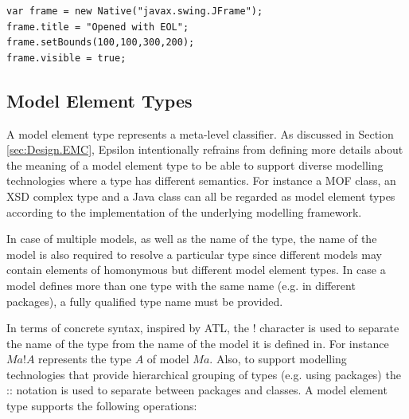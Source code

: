\begin{lstlisting}[basicstyle=\ttfamily\footnotesize, flexiblecolumns=true, numbers=none, nolol=true, caption=Demonstration of NativeType in EOL, label=lst:Native, numbers=left, language=EOL, tabsize=2]
var frame = new Native("javax.swing.JFrame");
frame.title = "Opened with EOL";
frame.setBounds(100,100,300,200);
frame.visible = true;
\end{lstlisting}

\subsection{Model Element Types}

A model element type represents a meta-level classifier. As discussed in Section \ref{sec:Design.EMC}, Epsilon intentionally refrains from defining more details about the meaning of a model element type to be able to support diverse modelling technologies where a type has different semantics. For instance a MOF class, an XSD complex type and a Java class can all be regarded as model element types according to the implementation of the underlying modelling framework.

In case of multiple models, as well as the name of the type, the name of the model is also required to resolve a particular type since different models may contain elements of homonymous but different model element types. In case a model defines more than one type with the same name (e.g. in different packages), a fully qualified type name must be provided.

In terms of concrete syntax, inspired by ATL, the ! character is used to separate the name of the type from the name of the model it is defined in. For instance $Ma!A$ represents the type $A$ of model $Ma$. Also, to support modelling technologies that provide hierarchical grouping of types (e.g. using packages) the :: notation is used to separate between packages and classes.  A model element type supports the following operations:

